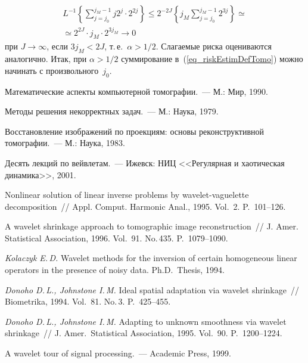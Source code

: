 \begin{multicols}{2}
\noindent
\begin{multline*}
L^{-1}\left\{\sum\limits_{j=j_0}^{j_M-1}j2^j\cdot2^{2j}\right\} \leq 2^{-2J}
\left\{j_M\sum\limits_{j=j_0}^{j_M-1}2^{3j}\right\} \simeq{}\\
{}\simeq 2^{2J}\cdot j_M\cdot2^{3j_M}\rightarrow 0
\end{multline*}
при $J\rightarrow\infty$, если $3j_M<2J$, т.\,е.\ 
$\alpha>1/2$. Слагаемые риска оцениваются аналогично. Итак, 
при $\alpha>1/2$ суммирование в~(\ref{eq_riskEstimDefTomo}) можно начинать с произвольного~$j_0$.


{\small\frenchspacing
{%
\begin{thebibliography}{99}

Математические аспекты компьютерной томографии.~--- М.: Мир, 1990.

Методы решения некорректных задач.~--- М.: Наука, 1979.

Восстановление изображений по проекциям: основы реконструктивной томографии.~--- М.: Наука, 1983.

Десять лекций по вейвлетам.~--- Ижевск: НИЦ <<Регулярная и хаотическая динамика>>, 2001.

Nonlinear solution of linear inverse problems by wavelet-vaguelette decomposition~// 
Appl. Comput. Harmonic Anal., 1995. Vol.~2. P.~101--126.

A wavelet shrinkage approach to tomographic image reconstruction~// J. Amer. Statistical Association, 1996. 
Vol.~91. No.\,435. P.~1079--1090.

\textit{Kolaczyk E.\,D.} 
Wavelet methods for the inversion of certain homogeneous linear operators in the presence of noisy data.  Ph.D.\ 
Thesis, 1994.

\textit{Donoho D.\,L., Johnstone I.\,M.} 
Ideal spatial adaptation via wavelet shrinkage~// Biometrika, 1994. Vol.~81. No.\,3. P.~425--455.

\bibitem{DJunkn}  %
\textit{Donoho D.\,L., Johnstone I.\,M.} 
Adapting to unknown smoothness via wavelet shrinkage~// J. Amer.\ Statistical Association, 1995. Vol.~90. P.~1200--1224.

\bibitem{Mallat} %
A wavelet tour of signal processing.~--- Academic Press, 1999.



\end{thebibliography}}}
\end{multicols}
